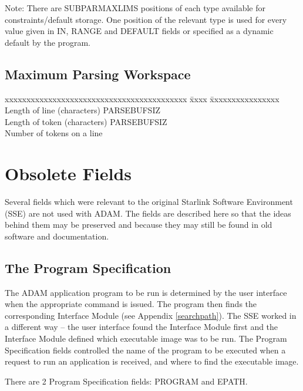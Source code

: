 \documentclass[twoside,11pt]{article}
\newcommand{\xlabel}[1]{}
\renewcommand{\_}{\texttt{\symbol{95}}}
\begin{document}
Note: There are SUBPAR\_\_MAXLIMS positions of each type available for
constraints/default storage. One position of the relevant type is used
for every value given in IN, RANGE and DEFAULT fields or specified as a dynamic
default by the program.

\subsection*{Maximum Parsing Workspace}
\begin{center}
\begin{tabbing}
xxxxxxxxxxxxxxxxxxxxxxxxxxxxxxxxxxxxxxxxxx \= xxxx \= xxxxxxxxxxxxxxxx \kill
Length of line (characters)  \> PARSE\_\_BUFSIZ \\
Length of token (characters)  \> PARSE\_\_BUFSIZ \\
Number of tokens on a line \\
\end{tabbing} \end{center}

\newpage
\section{Obsolete Fields\xlabel{obsolete_fields}}

Several fields which were relevant to the original Starlink Software
Environment (SSE) are not used with ADAM.
The fields are described here so that the ideas behind them may be preserved
and because they may still be found in old software and documentation.

\subsection{The Program Specification
\xlabel{the_program_specification}\label{program}}

The ADAM application program to be run is determined by the user interface
when the appropriate command is issued.
The program then finds the corresponding Interface Module (see Appendix
\ref{searchpath}).
The SSE worked in a different way -- the user interface found the Interface
Module first and the Interface Module defined which executable image
was to be run.
The Program Specification fields controlled the name of the program to be
executed when a request to run an application is received, and where to find
the executable image.

There are 2 Program Specification fields: PROGRAM and EPATH.
\end{document}
